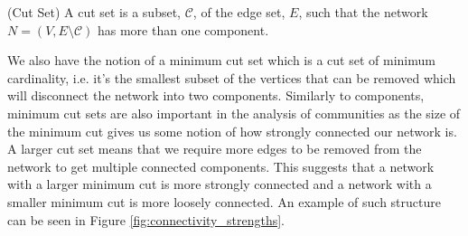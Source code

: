 \begin{definition}{(Cut Set)}
    A cut set is a subset, $\mathcal{C}$, of the edge set, $E$, such that the network $N = (V, E\setminus\mathcal{C})$ has more than one component.
\end{definition}

We also have the notion of a minimum cut set which is a cut set of minimum cardinality, i.e. it's the smallest subset of the vertices that can be removed which will disconnect the network into two components. Similarly to components, minimum cut sets are also important in the analysis of communities as the size of the minimum cut gives us some notion of how strongly connected our network is. A larger cut set means that we require more edges to be removed from the network to get multiple connected components. This suggests that a network with a larger minimum cut is more strongly connected and a network with a smaller minimum cut is more loosely connected. An example of such structure can be seen in Figure \ref{fig:connectivity_strengths}.

